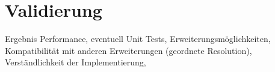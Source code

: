 
\chapter{Validierung}

Ergebnis Performance,
eventuell Unit Tests,
Erweiterungsmöglichkeiten,
Kompatibilität mit anderen Erweiterungen (geordnete Resolution),
Verständlichkeit der Implementierung,